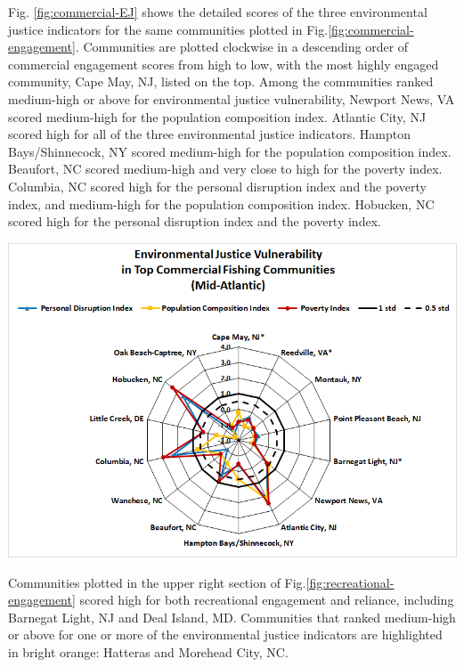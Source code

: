 \documentclass[
  10pt,
]{article}
\let\origfigure\figure
\let\endorigfigure\endfigure
\renewenvironment{figure}[1][2] {
    \expandafter\origfigure\expandafter[H]
} {
    \endorigfigure
}
\begin{document}
Fig. \ref{fig:commercial-EJ} shows the detailed scores of the three
environmental justice indicators for the same communities plotted in
Fig.\ref{fig:commercial-engagement}. Communities are plotted clockwise
in a descending order of commercial engagement scores from high to low,
with the most highly engaged community, Cape May, NJ, listed on the top.
Among the communities ranked medium-high or above for environmental
justice vulnerability, Newport News, VA scored medium-high for the
population composition index. Atlantic City, NJ scored high for all of
the three environmental justice indicators. Hampton Bays/Shinnecock, NY
scored medium-high for the population composition index. Beaufort, NC
scored medium-high and very close to high for the poverty index.
Columbia, NC scored high for the personal disruption index and the
poverty index, and medium-high for the population composition index.
Hobucken, NC scored high for the personal disruption index and the
poverty index.

\begin{figure}

{\centering \includegraphics[width=0.7\linewidth]{images/EJ_Commercial_MAB} 

}

\caption{Environmental justice indicators (Poverty Index, population composition index, and personal disruption index) for top commercial fishing communities in Mid-Atlantic. *Scored high (1.00 and above)) for both commercial engagement and reliance indicators}\label{fig:commercial-EJ}
\end{figure}

Communities plotted in the upper right section of
Fig.\ref{fig:recreational-engagement} scored high for both recreational
engagement and reliance, including Barnegat Light, NJ and Deal Island,
MD. Communities that ranked medium-high or above for one or more of the
environmental justice indicators are highlighted in bright orange:
Hatteras and Morehead City, NC.
\end{document}
